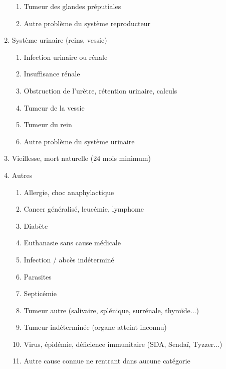 \documentclass[a4paper,10pt]{article}
\begin{document}
\begin{enumerate}
\begin{enumerate}
\item Tumeur des glandes préputiales
\item Autre problème du système reproducteur
\end{enumerate}
\item Système urinaire (reins, vessie)
\begin{enumerate}
\item Infection urinaire ou rénale
\item Insuffisance rénale
\item Obstruction de l’urètre, rétention urinaire, calculs
\item Tumeur de la vessie
\item Tumeur du rein
\item Autre problème du système urinaire
\end{enumerate}
\item Vieillesse, mort naturelle (24 mois minimum)
\item Autres
\begin{enumerate}
\item Allergie, choc anaphylactique
\item Cancer généralisé, leucémie, lymphome
\item Diabète
\item Euthanasie sans cause médicale
\item Infection / abcès indéterminé
\item Parasites
\item Septicémie
\item Tumeur autre (salivaire, splénique, surrénale, thyroïde...)
\item Tumeur indéterminée (organe atteint inconnu)
\item Virus, épidémie, déficience immunitaire (SDA, Sendaï, Tyzzer...)
\item Autre cause connue ne rentrant dans aucune catégorie
\end{enumerate}
\end{enumerate}
\end{document}
